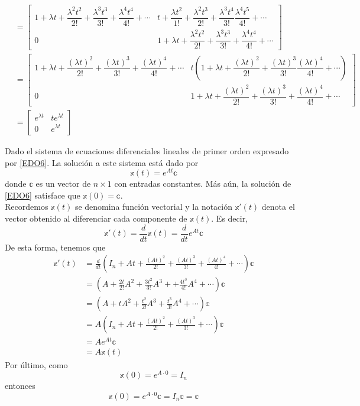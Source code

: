 \begin{example}
\begin{align*}
        \\
        & = \begin{bmatrix} 1 + \lambda t + \dfrac{\lambda^2 t^2}{2!} + \dfrac{\lambda^3 t^3}{3!} + \dfrac{\lambda^4 t^4}{4!} + \cdots & t + \dfrac{\lambda t^2}{1!} + \dfrac{\lambda^2 t^3}{2!} + \dfrac{\lambda^3 t^4}{3!} \dfrac{\lambda^4 t^5}{4!} + \cdots \\[3mm] 0 & 1 + \lambda t + \dfrac{\lambda^2 t^2}{2!} + \dfrac{\lambda^3 t^3}{3!} + \dfrac{\lambda^4 t^4}{4!} + \cdots \end{bmatrix} \\
        & = \begin{bmatrix} 1 + \lambda t + \dfrac{(\lambda t)^2}{2!} + \dfrac{(\lambda t)^3}{3!} + \dfrac{(\lambda t)^4}{4!} + \cdots & t\left( 1 + \lambda t + \dfrac{(\lambda t)^2}{2!} + \dfrac{(\lambda t)^3}{3!} \dfrac{(\lambda t)^4}{4!} + \cdots \right) \\[3mm] 0 & 1 + \lambda t + \dfrac{(\lambda t)^2}{2!} + \dfrac{(\lambda t)^3}{3!} + \dfrac{(\lambda t)^4}{4!} + \cdots \end{bmatrix} \\
        & = \begin{bmatrix} e^{\lambda t} & te^{\lambda t} \\ 0 & e^{\lambda t} \end{bmatrix}
    \end{align*}
\end{example}

\begin{theorem}
    Dado el sistema de ecuaciones diferenciales lineales de primer orden expresado por \eqref{EDO6}. La solución a este sistema está dado por
    $$\mathbb{x}(t) = e^{At} \mathbb{c}$$
    donde $\mathbb{c}$ es un vector de $n \times 1$ con entradas constantes. Más aún, la solución de \eqref{EDO6} satisface que $\mathbb{x}(0) = \mathbb{c}$. \\
    \demostracion Recordemos $\mathbb{x}(t)$ se denomina función vectorial y la notación $\mathbb{x}'(t)$ denota el vector obtenido al diferenciar cada componente de $\mathbb{x}(t)$. Es decir,
    $$\mathbb{x}'(t) = \frac{d}{dt} \mathbb{x}(t) = \frac{d}{dt} e^{At} \mathbb{c}$$
    De esta forma, tenemos que
    \begin{align*}
        \mathbb{x}'(t) & = \frac{d}{dt} \left( I_n + At + \frac{(At)^2}{2!} + \frac{(At)^3}{3!} + \frac{(At)^4}{4!} + \cdots \right) \mathbb{c} \\
        & = \left( A + \frac{2t}{2!} A^2 + \frac{3t^2}{3!}A^3 + + \frac{4t^3}{4!}A^4 + \cdots \right) \mathbb{c} \\
        & = \left( A + tA^2 + \frac{t^2}{2!}A^3 + \frac{t^3}{3!}A^4 + \cdots \right) \mathbb{c} \\
        & = A \left( I_n + At + \frac{(At)^2}{2!} + \frac{(At)^3}{3!} + \cdots \right) \mathbb{c} \\
        & = Ae^{At} \mathbb{c} \\
        & = A \mathbb{x}(t)
    \end{align*}
    Por último, como
    $$\mathbb{x}(0) = e^{A \cdot 0} = I_n$$
    entonces
    $$\mathbb{x}(0) = e^{A \cdot 0} \mathbb{c} = I_n \mathbb{c} = \mathbb{c}$$
\end{theorem}

